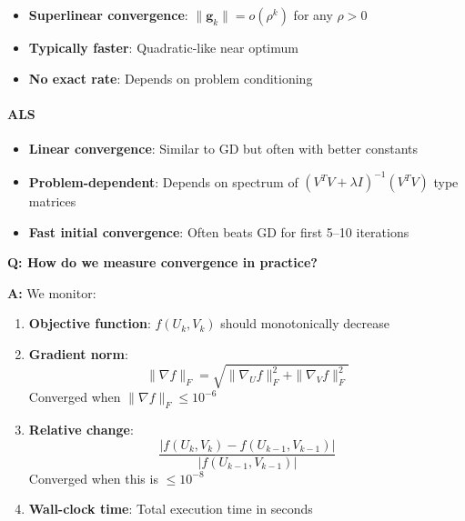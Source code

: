\documentclass[11pt,oneside]{article}
\newcommand{\grad}{\nabla}
\newcommand{\question}[1]{\textbf{Q: #1}}
\newcommand{\answer}{\textbf{A: }}
\begin{document}
\begin{itemize}
    \item \textbf{Superlinear convergence}: $\|\mathbf{g}_k\| = o(\rho^k)$ for any $\rho > 0$
    \item \textbf{Typically faster}: Quadratic-like near optimum
    \item \textbf{No exact rate}: Depends on problem conditioning
\end{itemize}

\paragraph{ALS}

\begin{itemize}
    \item \textbf{Linear convergence}: Similar to GD but often with better constants
    \item \textbf{Problem-dependent}: Depends on spectrum of $(V^TV + \lambda I)^{-1}(V^TV)$ type matrices
    \item \textbf{Fast initial convergence}: Often beats GD for first 5--10 iterations
\end{itemize}

\medskip

\question{How do we measure convergence in practice?}

\answer We monitor:

\begin{enumerate}
    \item \textbf{Objective function}: $f(U_k, V_k)$ should monotonically decrease
    \item \textbf{Gradient norm}: 
    \begin{equation}
        \|\grad f\|_F = \sqrt{\|\grad_U f\|_F^2 + \|\grad_V f\|_F^2}
    \end{equation}
    Converged when $\|\grad f\|_F \leq 10^{-6}$
    
    \item \textbf{Relative change}:
    \begin{equation}
        \frac{|f(U_k, V_k) - f(U_{k-1}, V_{k-1})|}{|f(U_{k-1}, V_{k-1})|}
    \end{equation}
    Converged when this is $\leq 10^{-8}$
    
    \item \textbf{Wall-clock time}: Total execution time in seconds
\end{enumerate}

\end{document}
